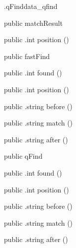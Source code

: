 \begin{CrexxClass}{.qFind}{data\_qfind}

  \begin{Hierarchy}
  \end{Hierarchy}

  \begin{Members}

    \Factory
      {public}
      {matchResult}
      {}

    \Method
      {public}
      {.int}
      {position}
      {()}

    \Factory
      {public}
      {fastFind}
      {}

    \Method
      {public}
      {.int}
      {found}
      {()}

    \Method
      {public}
      {.int}
      {position}
      {()}

    \Method
      {public}
      {.string}
      {before}
      {()}

    \Method
      {public}
      {.string}
      {match}
      {()}

    \Method
      {public}
      {.string}
      {after}
      {()}

    \Factory
      {public}
      {qFind}
      {}

    \Method
      {public}
      {.int}
      {found}
      {()}

    \Method
      {public}
      {.int}
      {position}
      {()}

    \Method
      {public}
      {.string}
      {before}
      {()}

    \Method
      {public}
      {.string}
      {match}
      {()}

    \Method
      {public}
      {.string}
      {after}
      {()}

  \end{Members}
\end{CrexxClass}

